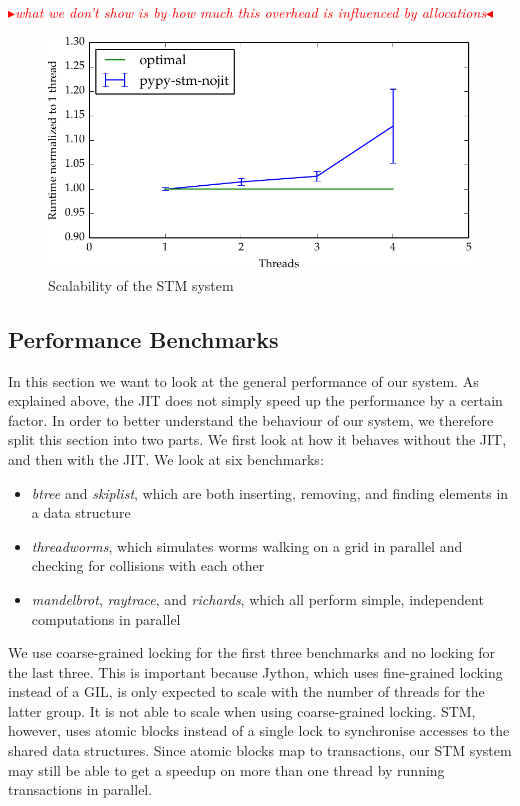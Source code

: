 \documentclass{sigplanconf}
\newcommand{\mynote}[2]{%
  \textcolor{red}{%
    \fbox{\bfseries\sffamily\scriptsize#1}%
    {\small$\blacktriangleright$\textsf{\emph{#2}}$\blacktriangleleft$}%
  }%
}
\newcommand\remi[1]{\mynote{Remi}{#1}}
\begin{document}
\remi{what we don't show is by how much this overhead is influenced
by allocations}

\begin{figure}[h]
  \centering
  \includegraphics[width=1\columnwidth]{plots/scaling.pdf}
  \caption{Scalability of the STM system\label{fig:scaling}}
\end{figure}


\subsection{Performance Benchmarks\label{sec:performance-bench}}

In this section we want to look at the general performance of our
system. As explained above, the JIT does not simply speed up the
performance by a certain factor. In order to better understand the
behaviour of our system, we therefore split this section into two
parts. We first look at how it behaves without the JIT, and then with
the JIT. We look at six benchmarks:

\begin{itemize}
\item \emph{btree} and \emph{skiplist}, which are both inserting,
  removing, and finding elements in a data structure
\item \emph{threadworms}, which simulates worms walking on a grid in
  parallel and checking for collisions with each other
\item \emph{mandelbrot}, \emph{raytrace}, and \emph{richards}, which
  all perform simple, independent computations in parallel
\end{itemize}

We use coarse-grained locking for the first three benchmarks and no
locking for the last three. This is important because Jython, which
uses fine-grained locking instead of a GIL, is only expected to scale
with the number of threads for the latter group. It is not able to
scale when using coarse-grained locking. STM, however, uses atomic
blocks instead of a single lock to synchronise accesses to the
shared data structures. Since atomic blocks map to transactions,
our STM system may still be able to get a speedup on more than one
thread by running transactions in parallel.
\end{document}
